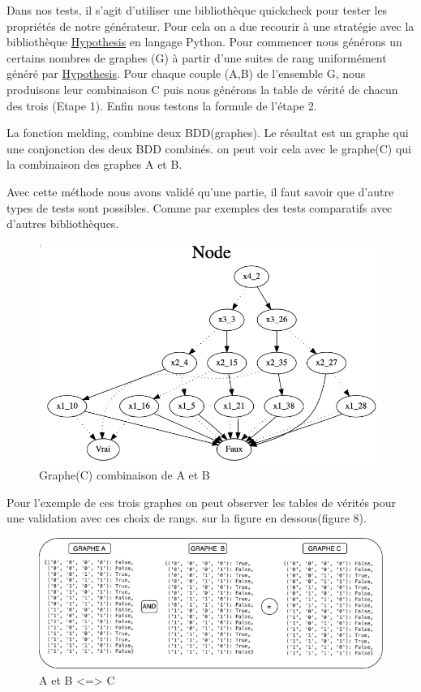\documentclass[french]{article}
\begin{document}
Dans nos tests, il s'agit d'utiliser une bibliothèque quickcheck pour tester les propriétés de notre générateur.
Pour cela on a due recourir à une stratégie avec la bibliothèque \href{https://hypothesis.works}{Hypothesis} en langage Python.  Pour commencer nous générons un certains nombres de graphes (G) à partir d'une suites de rang uniformément généré par \href{https://hypothesis.works}{Hypothesis}. Pour chaque couple (A,B) de l'ensemble G, nous produisons leur combinaison C puis nous générons la table de vérité de chacun des trois (Etape 1). Enfin nous testons la formule de l'étape 2.\medskip

La fonction melding, combine deux BDD(graphes). Le résultat est un graphe qui une conjonction des deux BDD combinés. on peut voir cela avec le graphe(C) qui la combinaison des graphes A et B.

Avec cette méthode nous avons validé qu'une partie, il faut savoir que d'autre types de tests sont possibles. Comme par exemples des tests comparatifs avec d'autres bibliothèques.

\begin{figure}[h!]
    \centering
    \includegraphics[scale=0.4]{abr_melding_C.png}
    \caption{Graphe(C) combinaison de A et B}
    \label{fig:graphe_B}
\end{figure}

Pour l'exemple de ces trois graphes on peut observer les tables de vérités pour une validation avec ces choix de rangs. sur la figure en dessous(figure 8).

\begin{figure}[h!]
    \centering
    \includegraphics[scale=0.5]{and_ABC.png}
    \caption{A et B <=> C}
    \label{fig:and_abc}
\end{figure}
\end{document}
